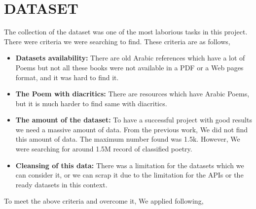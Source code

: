 \chapter{\uppercase{Dataset}}\label{ch:datasets}  

  The collection of the dataset was one of the most laborious tasks in this project. There were criteria we were searching to find. These criteria are as follows,
  \begin{itemize}
    
  \item \textbf{Datasets availability:} There are old Arabic references which have a lot of Poems but not all these books were not available in a PDF or a Web pages format, and it was hard to find it.
    
  \item \textbf{The Poem with diacritics:} There are resources which have Arabic Poems, but it is much harder to find same with diacritics.
    
  \item \textbf{The amount of the dataset:} To have a successful project with good results we need a massive amount of data. From the previous work, We did not find this amount of data. The maximum number found was 1.5k. However, We were searching for around 1.5M record of classified poetry.

  
\item \textbf{Cleansing of this data:} There was a limitation for the datasets which we can consider it, or we can scrap it due to the limitation for the APIs or the ready datasets in this context.
  
\end{itemize}
To meet the above criteria and overcome it, We applied following,

